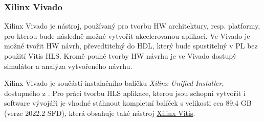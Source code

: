 \documentclass[a4paper, twoside, 11pt]{article}
\begin{document}
		\subsubsection{Xilinx Vivado}\label{subsubsec:xilinx-vivado}
			Xilinx Vivado je nástroj, používaný pro tvorbu HW architektury, resp. platformy, pro kterou bude následně možné vytvořit akcelerovanou aplikaci. Ve Vivado je možné tvořit HW návrh, převedtitelný do HDL, který bude spustitelný v PL bez použití Vitis HLS. Kromě pouhé tvorby HW návrhu je ve Vivado dostupý simulátor a analýza vytvořeného návrhu.\par
			Xilinx Vivado je součástí instalačního balíčku \textit{Xilinx Unified Installer}, dostupného z \cite{xilinx-downloads}. Pro práci tvorbu HLS aplikace, kterou jsou schopni vytvořit i software vývojáři je vhodné stáhnout kompletní balíček s velikosti cca 89,4 GB (verze 2022.2 SFD), která obsahuje také nástroj \hyperref[subsubsec:xilinx-vitis]{Xilinx Vitis}.
\end{document}
